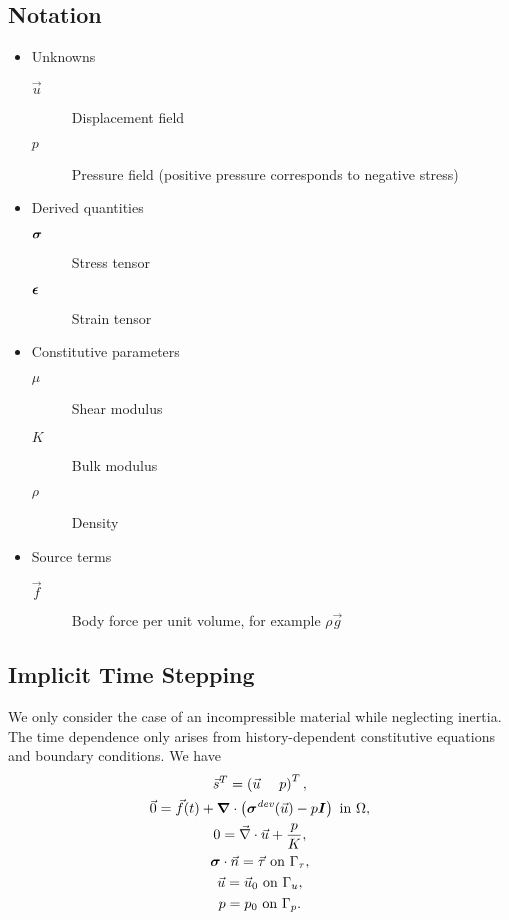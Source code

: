 \subsection{Notation}
\begin{itemize}
\item Unknowns
  \begin{description}
  \item[$\vec{u}$] Displacement field
  \item[$p$] Pressure field (positive pressure corresponds to negative stress)
  \end{description}
\item Derived quantities
  \begin{description}
    \item[$\bm{\sigma}$] Stress tensor
    \item[$\bm{\epsilon}$] Strain tensor
  \end{description}
\item Constitutive parameters
  \begin{description}
  \item[$\mu$] Shear modulus
  \item[$K$] Bulk modulus
  \item[$\rho$] Density
  \end{description}
\item Source terms
  \begin{description}
    \item[$\vec{f}$] Body force per unit volume, for example $\rho \vec{g}$
  \end{description}
\end{itemize}


\subsection{Implicit Time Stepping}

We only consider the case of an incompressible material while
neglecting inertia. The time dependence only arises from
history-dependent constitutive equations and boundary conditions. We
have
\begin{gather}
  \vec{s}^T = \left( \vec{u} \quad \ p \right)^T, \\
  \vec{0} = \vec{f}(t) + \bm{\nabla} \cdot \left(\bm{\sigma}^\mathit{dev}(\vec{u}) - p\bm{I}\right) \text{ in }\Omega, \\
  0 = \vec{\nabla} \cdot \vec{u} + \frac{p}{K}, \\
  \bm{\sigma} \cdot \vec{n} = \vec{\tau} \text{ on }\Gamma_\tau, \\
  \vec{u} = \vec{u}_0 \text{ on }\Gamma_u, \\
  p = p_0 \text{ on }\Gamma_p.
\end{gather}

